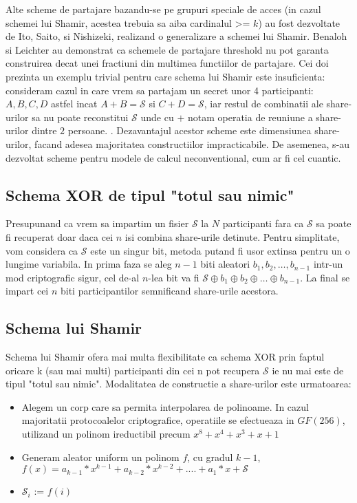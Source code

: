 \documentclass{llncs}
\begin{document}
Alte scheme de partajare bazandu-se pe grupuri speciale de acces (in cazul schemei lui Shamir, acestea trebuia sa aiba cardinalul >= $k$) au fost dezvoltate de Ito, Saito, si Nishizeki, realizand o generalizare a schemei lui Shamir. \cite{ITO:1989}
Benaloh si Leichter au demonstrat ca schemele de partajare threshold nu pot garanta construirea decat unei fractiuni din multimea functiilor de partajare. Cei doi prezinta un exemplu trivial pentru care schema lui Shamir este insuficienta: consideram cazul in care vrem sa partajam un secret unor 4 participanti: $A, B, C, D$ astfel incat $A + B = \mathcal{S}$ si $C + D = \mathcal{S}$, iar restul de combinatii ale share-urilor sa nu poate reconstitui $\mathcal{S}$ unde cu $+$ notam operatia de reuniune a share-urilor dintre $2$ persoane. \cite{JJ:1990}.
Dezavantajul acestor scheme este dimensiunea share-urilor, facand adesea majoritatea constructiilor impracticabile. \cite{Survey:2011}
De asemenea, s-au dezvoltat scheme pentru modele de calcul neconventional, cum ar fi cel cuantic. \cite{hillery:1999}

\subsection{Schema XOR de tipul "totul sau nimic"}


Presupunand ca vrem sa impartim un fisier $\mathcal{S}$ la $N$ participanti fara ca $\mathcal{S}$ sa poate fi recuperat doar daca cei $n$ isi combina share-urile detinute. Pentru simplitate, vom considera ca $\mathcal{S}$ este un singur bit, metoda putand fi usor extinsa pentru un o lungime variabila.
In prima faza se aleg $n - 1$ biti aleatori $b_1, b_2, \dots, b_{n - 1}$ intr-un mod criptografic sigur, cel de-al $n$-lea bit va fi $\mathcal{S} \oplus b_1 \oplus b_2 \oplus \dots \oplus b_{n - 1}$. La final se impart cei $n$ biti participantilor semnificand share-urile acestora.

\subsection{Schema lui Shamir}

Schema lui Shamir ofera mai multa flexibilitate ca schema XOR prin faptul oricare k (sau mai multi) participanti din cei n pot recupera $\mathcal{S}$ ie nu mai este de tipul "totul sau nimic". Modalitatea de constructie a share-urilor este urmatoarea: \cite{S:1979}
\begin{itemize}
	\item Alegem un corp care sa permita interpolarea de polinoame. In cazul majoritatii protocoalelor criptografice, operatiile se efectueaza in $GF(256)$, utilizand un polinom ireductibil precum $x^8 + x^4 + x^3 + x + 1$
	\item Generam aleator uniform un polinom $f$, cu gradul $k - 1$, $f(x) = a_{k-1} * x ^ {k-1} + a_{k-2} * x ^ {k - 2} + .... + a_1 * x + \mathcal{S}$
	\item $\mathcal{S}_i$ := $f(i)$
\end{itemize}
\end{document}
